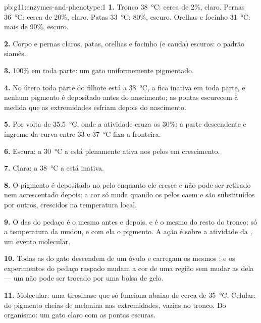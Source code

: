 \begin{solution}{pb:g11:enzymes-and-phenotype:1}
\textbf{1.} Tronco \qty{38}{\celsius}: cerca de 2\%, claro. Pernas
\qty{36}{\celsius}: cerca de 20\%, claro. Patas \qty{33}{\celsius}:
80\%, escuro. Orelhas e focinho \qty{31}{\celsius}: mais de 90\%, escuro.

\textbf{2.} Corpo e pernas claros, patas, orelhas e focinho (e cauda)
escuros: o padrão siamês.

\textbf{3.} 100\% em toda parte: um gato uniformemente pigmentado.

\textbf{4.} No útero toda parte do filhote está a \qty{38}{\celsius}, a
 fica inativa em toda parte, e nenhum pigmento é depositado antes
do nascimento; as pontas escurecem à medida que as extremidades esfriam
depois do nascimento.

\textbf{5.} Por volta de \qty{35.5}{\celsius}, onde a atividade cruza
os 30\%: a parte descendente e íngreme da curva entre 33 e
\qty{37}{\celsius} fixa a fronteira.

\textbf{6.} Escura: a \qty{30}{\celsius} a  está plenamente ativa
nos pelos em crescimento.

\textbf{7.} Clara: a \qty{38}{\celsius} a  está inativa.

\textbf{8.} O pigmento é depositado no pelo enquanto ele cresce e não
pode ser retirado nem acrescentado depois; a cor só muda quando os
pelos caem e são substituídos por outros, crescidos na temperatura
local.

\textbf{9.} O  das  do pedaço é o mesmo antes e depois,
e é o mesmo do resto do tronco; só a temperatura da  mudou, e com
ela o pigmento. A ação é sobre a atividade da , um evento
molecular.

\textbf{10.} Todas as  do gato descendem de um óvulo e carregam
os mesmos ; e os experimentos do pedaço raspado mudam a cor de
uma região sem mudar as  dela --- um  não pode ser trocado
por uma bolsa de gelo.

\textbf{11.} Molecular: uma tirosinase que só funciona abaixo de cerca
de \qty{35}{\celsius}. Celular:  do pigmento cheias de melanina
nas extremidades, vazias no tronco. Do organismo: um gato claro com as
pontas escuras.


\end{solution}
